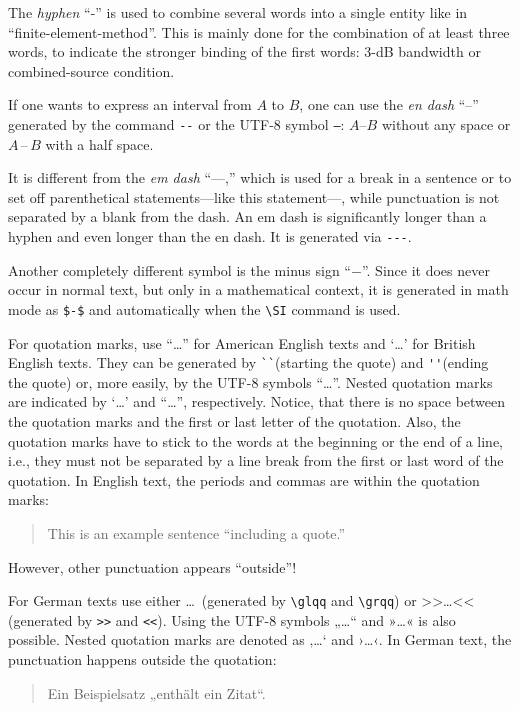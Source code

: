 The \emph{hyphen} ``-'' is used to combine several words into a single entity like in ``finite-element-method''. 
This is mainly done for the combination of at least three words, to indicate the stronger binding of the first words: 
3-dB bandwidth or combined-source condition.

If one wants to express an interval from $A$ to $B$, one can use the \emph{en dash} ``--'' generated by the command \verb|--| or the UTF-8 symbol \verb|–|: $A$--$B$ without any space or $A$\,--\,$B$ with a half space.

It is different from the \emph{em dash} ``---,'' which is used for a break in a sentence or to set off parenthetical statements---like this statement---, while punctuation is not separated by a blank from the dash. 
An em dash is significantly longer than a hyphen and even longer than the en dash. 
It is generated via \verb|---|.  

Another completely different symbol is the minus sign “$-$”. 
Since it does never occur in normal text, but only in a mathematical context, it is generated in math mode as \verb|$-$| and automatically when the  \verb|\SI| command is used.

For quotation marks, use “\ldots” for American English texts and ‘…’ for British English texts.  
They can be generated by \verb|``|(starting the quote) and \verb|''|(ending the quote) or, more easily, by the UTF-8 symbols “…”.	 Nested quotation marks are indicated by  ‘…’ and “\ldots”, respectively. 
Notice, that there is no space between the quotation marks and the first or last letter of the quotation. 
Also, the quotation marks have to stick to the words at the beginning or the end of a line, i.e., they must not be separated by a line break from the first or last word of the quotation. 
In English text, the periods and commas are within the quotation marks:
\begin{quote}\small
    This is an example sentence “including a quote.”
\end{quote}
However, other punctuation appears “outside”!

For German texts use either \glqq\ldots\grqq\ (generated by \verb|\glqq| and \verb|\grqq|) or >>\ldots<< (generated by \verb|>>| and \verb|<<|).
Using the UTF-8 symbols „…“ and »…« is also possible. 
Nested quotation marks are denoted as ‚…‘ and ›…‹.
In German text, the punctuation happens outside the quotation:
\begin{quote}\small
    Ein Beispielsatz „enthält ein Zitat“.
\end{quote}

